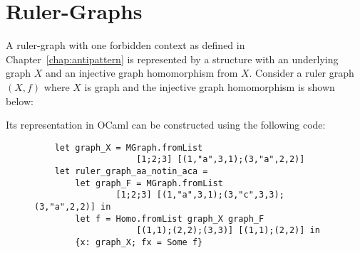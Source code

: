 \section{Ruler-Graphs}
A ruler-graph with one forbidden context as defined in Chapter~\ref{chap:antipattern} is represented by a structure with an underlying graph $X$ and an injective graph homomorphism from $X$. 
Consider a ruler graph $(X, f)$ where $X$ is graph  
and the injective graph homomorphism is shown below:
\begin{center}
\end{center}
Its representation in OCaml
        can be constructed using the following code:
\begin{figure}[H]
\begin{verbatim} 
    let graph_X = MGraph.fromList 
                    [1;2;3] [(1,"a",3,1);(3,"a",2,2)]
    let ruler_graph_aa_notin_aca = 
        let graph_F = MGraph.fromList 
                [1;2;3] [(1,"a",3,1);(3,"c",3,3);(3,"a",2,2)] in
        let f = Homo.fromList graph_X graph_F 
                    [(1,1);(2,2);(3,3)] [(1,1);(2,2)] in
        {x: graph_X; fx = Some f}
\end{verbatim}
    \caption{}
    \label{fig:implemented:ruler_graph_representation}
\end{figure}


